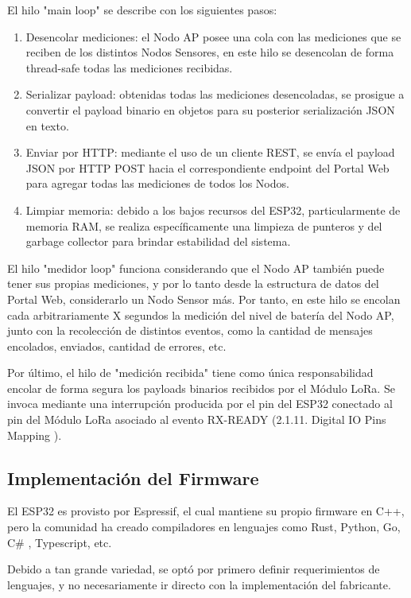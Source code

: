 El hilo "main loop" se describe con los siguientes pasos:
\begin{enumerate}
    \item Desencolar mediciones: el Nodo AP posee una cola con las mediciones que se reciben de los distintos Nodos Sensores, en este hilo se desencolan de forma thread-safe todas las mediciones recibidas.
    \item Serializar payload: obtenidas todas las mediciones desencoladas, se prosigue a convertir el payload binario en objetos para su posterior serialización JSON en texto.
    \item Enviar por HTTP: mediante el uso de un cliente REST, se envía el payload JSON por HTTP POST hacia el correspondiente endpoint del Portal Web para agregar todas las mediciones de todos los Nodos.
    \item Limpiar memoria: debido a los bajos recursos del ESP32, particularmente de memoria RAM, se realiza específicamente una limpieza de punteros y del garbage collector para brindar estabilidad del sistema.
\end{enumerate}

El hilo "medidor loop" \space funciona considerando que el Nodo AP también puede tener sus propias mediciones, y por lo tanto desde la estructura de datos del Portal Web, considerarlo un Nodo Sensor más. Por tanto, en este hilo se encolan cada arbitrariamente X segundos la medición del nivel de batería del Nodo AP, junto con la recolección de distintos eventos, como la cantidad de mensajes encolados, enviados, cantidad de errores, etc.

Por último, el hilo de "medición recibida" tiene como única responsabilidad encolar de forma segura los payloads binarios recibidos por el Módulo LoRa. Se invoca mediante una interrupción producida por el pin del ESP32 conectado al pin del Módulo LoRa asociado al evento RX-READY (2.1.11. Digital IO Pins Mapping \cite{LoraDatasheet}).

\subsection{Implementación del Firmware}

El ESP32 es provisto por Espressif, el cual mantiene su propio firmware en C++, pero la comunidad ha creado compiladores en lenguajes como Rust, Python, Go, C\# , Typescript, etc.

Debido a tan grande variedad, se optó por primero definir requerimientos de lenguajes, y no necesariamente ir directo con la implementación del fabricante.

